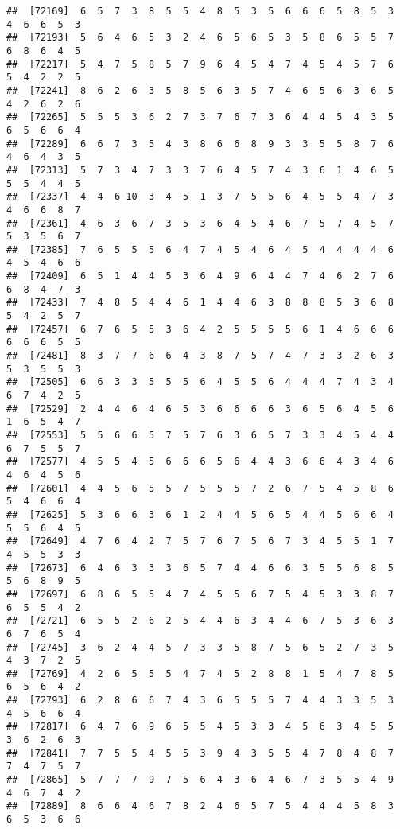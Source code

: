 \documentclass[
]{book}
\begin{document}
\begin{verbatim}
##  [72169]  6  5  7  3  8  5  5  4  8  5  3  5  6  6  6  5  8  5  3  4  6  6  5  3
##  [72193]  5  6  4  6  5  3  2  4  6  5  6  5  3  5  8  6  5  5  7  6  8  6  4  5
##  [72217]  5  4  7  5  8  5  7  9  6  4  5  4  7  4  5  4  5  7  6  5  4  2  2  5
##  [72241]  8  6  2  6  3  5  8  5  6  3  5  7  4  6  5  6  3  6  5  4  2  6  2  6
##  [72265]  5  5  5  3  6  2  7  3  7  6  7  3  6  4  4  5  4  3  5  6  5  6  6  4
##  [72289]  6  6  7  3  5  4  3  8  6  6  8  9  3  3  5  5  8  7  6  4  6  4  3  5
##  [72313]  5  7  3  4  7  3  3  7  6  4  5  7  4  3  6  1  4  6  5  5  5  4  4  5
##  [72337]  4  4  6 10  3  4  5  1  3  7  5  5  6  4  5  5  4  7  3  4  6  6  8  7
##  [72361]  4  6  3  6  7  3  5  3  6  4  5  4  6  7  5  7  4  5  7  5  3  5  6  7
##  [72385]  7  6  5  5  5  6  4  7  4  5  4  6  4  5  4  4  4  4  6  4  5  4  6  6
##  [72409]  6  5  1  4  4  5  3  6  4  9  6  4  4  7  4  6  2  7  6  6  8  4  7  3
##  [72433]  7  4  8  5  4  4  6  1  4  4  6  3  8  8  8  5  3  6  8  5  4  2  5  7
##  [72457]  6  7  6  5  5  3  6  4  2  5  5  5  5  6  1  4  6  6  6  6  6  6  5  5
##  [72481]  8  3  7  7  6  6  4  3  8  7  5  7  4  7  3  3  2  6  3  5  3  5  5  3
##  [72505]  6  6  3  3  5  5  5  6  4  5  5  6  4  4  4  7  4  3  4  6  7  4  2  5
##  [72529]  2  4  4  6  4  6  5  3  6  6  6  6  3  6  5  6  4  5  6  1  6  5  4  7
##  [72553]  5  5  6  6  5  7  5  7  6  3  6  5  7  3  3  4  5  4  4  6  7  5  5  7
##  [72577]  4  5  5  4  5  6  6  6  5  6  4  4  3  6  6  4  3  4  6  4  6  4  5  6
##  [72601]  4  4  5  6  5  5  7  5  5  5  7  2  6  7  5  4  5  8  6  5  4  6  6  4
##  [72625]  5  3  6  6  3  6  1  2  4  4  5  6  5  4  4  5  6  6  4  5  5  6  4  5
##  [72649]  4  7  6  4  2  7  5  7  6  7  5  6  7  3  4  5  5  1  7  4  5  5  3  3
##  [72673]  6  4  6  3  3  3  6  5  7  4  4  6  6  3  5  5  6  8  5  5  6  8  9  5
##  [72697]  6  8  6  5  5  4  7  4  5  5  6  7  5  4  5  3  3  8  7  6  5  5  4  2
##  [72721]  6  5  5  2  6  2  5  4  4  6  3  4  4  6  7  5  3  6  3  6  7  6  5  4
##  [72745]  3  6  2  4  4  5  7  3  3  5  8  7  5  6  5  2  7  3  5  4  3  7  2  5
##  [72769]  4  2  6  5  5  5  4  7  4  5  2  8  8  1  5  4  7  8  5  6  5  6  4  2
##  [72793]  6  2  8  6  6  7  4  3  6  5  5  5  7  4  4  3  3  5  3  4  5  6  6  4
##  [72817]  6  4  7  6  9  6  5  5  4  5  3  3  4  5  6  3  4  5  5  3  6  2  6  3
##  [72841]  7  7  5  5  4  5  5  3  9  4  3  5  5  4  7  8  4  8  7  7  4  7  5  7
##  [72865]  5  7  7  7  9  7  5  6  4  3  6  4  6  7  3  5  5  4  9  4  6  7  4  2
##  [72889]  8  6  6  4  6  7  8  2  4  6  5  7  5  4  4  4  5  8  3  6  5  3  6  6

\end{verbatim}
\end{document}
